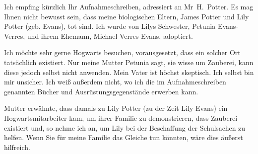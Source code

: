 \begin{writtenNote}


Ich empfing kürzlich Ihr Aufnahmeschreiben, adressiert an Mr~H.~Potter. Es mag Ihnen nicht bewusst sein, dass meine biologischen Eltern, James Potter und Lily Potter (geb. Evans), tot sind. Ich wurde von Lilys Schwester, Petunia Evans-Verres, und ihrem Ehemann, Michael Verres-Evans, adoptiert.

Ich möchte sehr gerne Hogwarts besuchen, vorausgesetzt, dass ein solcher Ort tatsächlich existiert. Nur meine Mutter Petunia sagt, sie wisse um Zauberei, kann diese jedoch selbst nicht anwenden. Mein Vater ist höchst skeptisch. Ich selbst bin mir unsicher. Ich weiß außerdem nicht, wo ich die im Aufnahmeschreiben genannten Bücher und Ausrüstungsgegenstände erwerben kann.

Mutter erwähnte, dass damals zu Lily Potter (zu der Zeit Lily Evans) ein Hogwartsmitarbeiter kam, um ihrer Familie zu demonstrieren, dass Zauberei existiert und, so nehme ich an, um Lily bei der Beschaffung der Schulsachen zu helfen. Wenn Sie für meine Familie das Gleiche tun könnten, wäre dies äußerst hilfreich.

\end{writtenNote}

